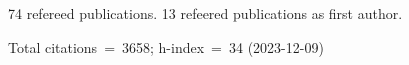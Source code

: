 74 refereed publications. 13 refeered publications as first author.

Total citations~=~3658; h-index~=~34 (2023-12-09)